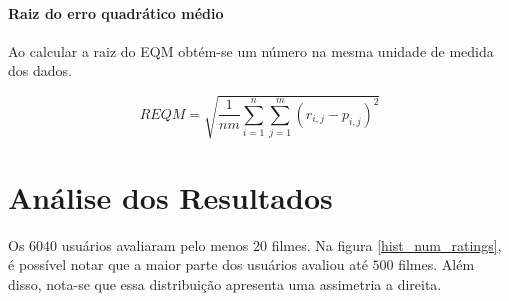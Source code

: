 \documentclass[12pt,a4paper,header]{abnt}
\begin{document}
\subsubsection{Raiz do erro quadrático médio}

Ao calcular a raiz do EQM obtém-se um número na mesma unidade de medida dos dados.

\begin{equation}
REQM = \sqrt{\frac{1}{nm} \sum_{i=1}^{n} \sum_{j=1}^m \left( r_{i,j} - p_{i,j}  \right)^2}
\end{equation}


% 
% 
% 
% 
% 
% 
% 
% 

\chapter{Análise dos Resultados}

Os $6040$ usuários avaliaram pelo menos $20$ filmes. Na figura \ref{hist_num_ratings}, é possível notar que a maior parte dos usuários avaliou até $500$ filmes. Além disso, nota-se que essa distribuição apresenta uma assimetria a direita.
\end{document}
